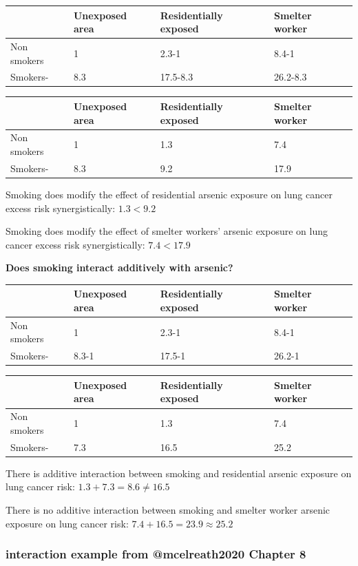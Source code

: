 \documentclass[
]{article}
\begin{document}
\begin{longtable}[]{@{}llll@{}}
\toprule
& Unexposed area & Residentially exposed & Smelter worker\tabularnewline
\midrule
\endhead
Non smokers & 1 & 2.3-1 & 8.4-1\tabularnewline
Smokers- & 8.3 & 17.5-8.3 & 26.2-8.3\tabularnewline
\bottomrule
\end{longtable}

\begin{longtable}[]{@{}llll@{}}
\toprule
& Unexposed area & Residentially exposed & Smelter worker\tabularnewline
\midrule
\endhead
Non smokers & 1 & 1.3 & 7.4\tabularnewline
Smokers- & 8.3 & 9.2 & 17.9\tabularnewline
\bottomrule
\end{longtable}

Smoking does modify the effect of residential arsenic exposure on lung
cancer excess risk synergistically: \(1.3 < 9.2\)

Smoking does modify the effect of smelter workers' arsenic exposure on
lung cancer excess risk synergistically: \(7.4 < 17.9\)

\textbf{Does smoking interact additively with arsenic?}

\begin{longtable}[]{@{}llll@{}}
\toprule
& Unexposed area & Residentially exposed & Smelter worker\tabularnewline
\midrule
\endhead
Non smokers & 1 & 2.3-1 & 8.4-1\tabularnewline
Smokers- & 8.3-1 & 17.5-1 & 26.2-1\tabularnewline
\bottomrule
\end{longtable}

\begin{longtable}[]{@{}llll@{}}
\toprule
& Unexposed area & Residentially exposed & Smelter worker\tabularnewline
\midrule
\endhead
Non smokers & 1 & 1.3 & 7.4\tabularnewline
Smokers- & 7.3 & 16.5 & 25.2\tabularnewline
\bottomrule
\end{longtable}

There is additive interaction between smoking and residential arsenic
exposure on lung cancer risk: \(1.3 + 7.3 = 8.6 \ne 16.5\)

There is no additive interaction between smoking and smelter worker
arsenic exposure on lung cancer risk: \(7.4 + 16.5 = 23.9 \approx 25.2\)

\hypertarget{interaction-example-from-mcelreath2020-chapter-8}{%
\subsubsection{interaction example from @mcelreath2020 Chapter
8}\label{interaction-example-from-mcelreath2020-chapter-8}}
\end{document}
